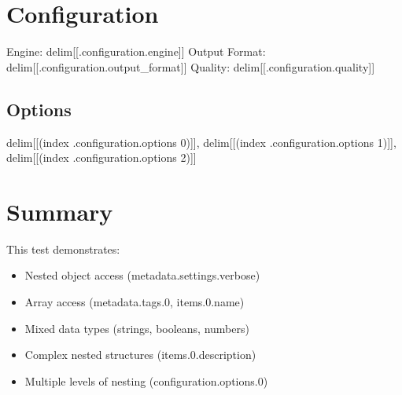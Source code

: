 \documentclass{article}
\begin{document}
\section{Configuration}
Engine: delim[[.configuration.engine]]
Output Format: delim[[.configuration.output_format]]
Quality: delim[[.configuration.quality]]

\subsection{Options}
delim[[(index .configuration.options 0)]], delim[[(index .configuration.options 1)]], delim[[(index .configuration.options 2)]]

\section{Summary}
This test demonstrates:
\begin{itemize}
\item Nested object access (metadata.settings.verbose)
\item Array access (metadata.tags.0, items.0.name)
\item Mixed data types (strings, booleans, numbers)
\item Complex nested structures (items.0.description)
\item Multiple levels of nesting (configuration.options.0)
\end{itemize}
\end{document}
